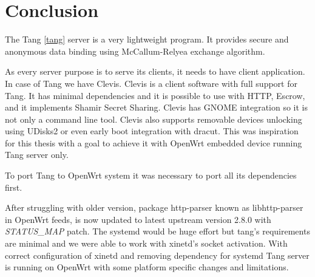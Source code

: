 \chapter{Conclusion}\label{conlusion}



The Tang \ref{tang} server is a very lightweight program.
It provides secure and anonymous data binding using McCallum-Relyea exchange algorithm.

As every server purpose is to serve its clients, it needs to have client application.
In case of Tang we have Clevis.
Clevis is a client software with full support for Tang.
It has minimal dependencies and it is possible to use with HTTP, Escrow, and it implements Shamir Secret Sharing.
Clevis has GNOME integration so it is not only a command line tool.
Clevis also supports removable devices unlocking using UDisks2 or even early boot integration with dracut.
This was inspiration for this thesis with a goal to achieve it with OpenWrt embedded device running Tang server only.

To port Tang to OpenWrt system it was necessary to port all its dependencies first.

After struggling with older version, package http-parser known as libhttp-parser in OpenWrt feeds, is now updated to latest upstream version 2.8.0 with {\it STATUS\_MAP} patch.
The systemd would be huge effort but tang's requirements are minimal and we were able to work with xinetd's socket activation.
With correct configuration of xinetd and removing dependency for systemd Tang server is running on OpenWrt with some platform specific changes and limitations.
